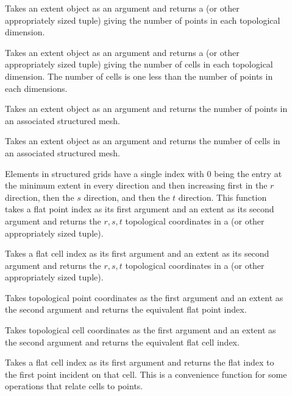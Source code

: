 \begin{description}
\item[] Takes an extent object as an argument
  and returns a  (or other appropriately sized tuple) giving the
  number of points in each topological dimension.
\item[] Takes an extent object as an argument
  and returns a  (or other appropriately sized tuple) giving the
  number of cells in each topological dimension. The number of cells is one
  less than the number of points in each dimensions.
\item[] Takes an extent object as an argument
  and returns the number of points in an associated structured mesh.
\item[] Takes an extent object as an argument and
  returns the number of cells in an associated structured mesh.
\item[] Elements in structured
  grids have a single index with 0 being the entry at the minimum extent in
  every direction and then increasing first in the $r$ direction, then the
  $s$ direction, and then the $t$ direction. This function takes a flat
  point index as its first argument and an extent as its second argument
  and returns the ${r,s,t}$ topological coordinates in a  (or
  other appropriately sized tuple).
\item[] Takes a flat cell index as
  its first argument and an extent as its second argument and returns the
  ${r,s,t}$ topological coordinates in a  (or other appropriately
  sized tuple).
\item[] Takes topological point
  coordinates as the first argument and an extent as the second argument
  and returns the equivalent flat point index.
\item[] Takes topological cell
  coordinates as the first argument and an extent as the second argument
  and returns the equivalent flat cell index.
\item[] Takes a flat cell index as its first
  argument and returns the flat index to the first point incident on that
  cell. This is a convenience function for some operations that relate
  cells to points.
\end{description}


